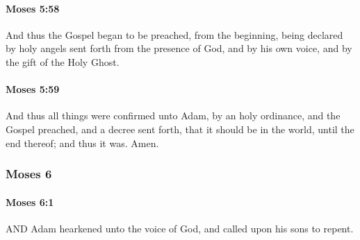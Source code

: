 		\paragraph{Moses 5:58} %
			\label{MOSES-5-58}

			And thus the Gospel began to be preached, from the beginning, being declared by holy angels sent forth from the presence of God, and by his own voice, and by the gift of the Holy Ghost.


		\paragraph{Moses 5:59} %
			\label{MOSES-5-59}

			And thus all things were confirmed unto Adam, by an holy ordinance, and the Gospel preached, and a decree sent forth, that it should be in the world, until the end thereof; and thus it was. Amen.

		
	\subsubsection{Moses 6} %
		\label{MOSES-6}
		
		\paragraph{Moses 6:1} %
			\label{MOSES-6-1}

			AND Adam hearkened unto the voice of God, and called upon his sons to repent.

